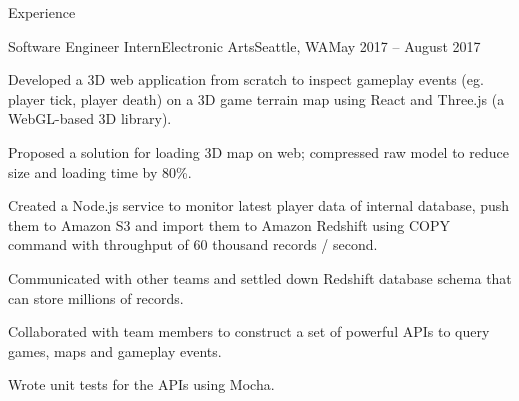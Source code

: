 \documentclass{resume} %
\begin{document}
\begin{rSection}{Experience}
\begin{rSubsection}{Software Engineer Intern}{Electronic Arts}{Seattle, WA}{May 2017 -- August 2017}
\item Developed a 3D web application from scratch to inspect gameplay events (eg. player tick, player death) on a 3D game terrain map using React and Three.js (a WebGL-based 3D library).
\item Proposed a solution for loading 3D map on web; compressed raw model to reduce size and loading time by 80\%.
\item Created a Node.js service to monitor latest player data of internal database, push them to Amazon S3 and import them to Amazon Redshift using COPY command with throughput of 60 thousand records / second.
\item Communicated with other teams and settled down Redshift database schema that can store millions of records.
\item Collaborated with team members to construct a set of powerful APIs to query games, maps and gameplay events.
\item Wrote unit tests for the APIs using Mocha.
\end{rSubsection}




\end{rSection}

\end{document}

